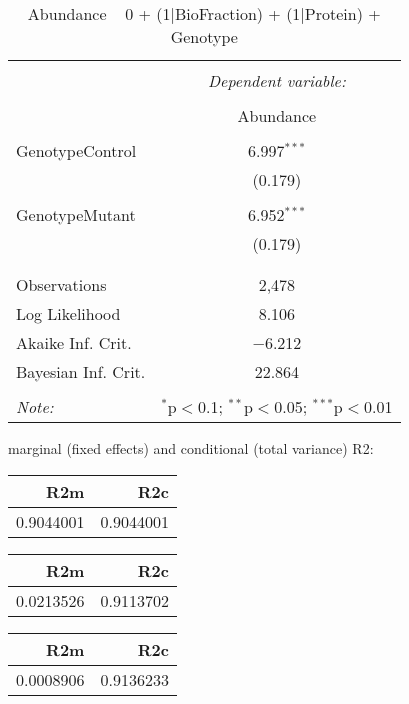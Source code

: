 \documentclass[11pt]{report}
\begin{document}
\begin{table}[!htbp] \centering 
  \caption{Abundance ~ 0 + (1|BioFraction) + (1|Protein) + Genotype} 
  \label{} 
\begin{tabular}{@{\extracolsep{5pt}}lc} 
\\[-1.8ex]\hline 
\hline \\[-1.8ex] 
 & \multicolumn{1}{c}{\textit{Dependent variable:}} \\ 
\cline{2-2} 
\\[-1.8ex] & Abundance \\ 
\hline \\[-1.8ex] 
 GenotypeControl & 6.997$^{***}$ \\ 
  & (0.179) \\ 
  & \\ 
 GenotypeMutant & 6.952$^{***}$ \\ 
  & (0.179) \\ 
  & \\ 
\hline \\[-1.8ex] 
Observations & 2,478 \\ 
Log Likelihood & 8.106 \\ 
Akaike Inf. Crit. & $-$6.212 \\ 
Bayesian Inf. Crit. & 22.864 \\ 
\hline 
\hline \\[-1.8ex] 
\textit{Note:}  & \multicolumn{1}{r}{$^{*}$p$<$0.1; $^{**}$p$<$0.05; $^{***}$p$<$0.01} \\ 
\end{tabular} 
\end{table} 
marginal (fixed effects) and conditional (total variance) R2:

\begin{tabular}{r|r}
\hline
R2m & R2c\\
\hline
0.9044001 & 0.9044001\\
\hline
\end{tabular}

\begin{tabular}{r|r}
\hline
R2m & R2c\\
\hline
0.0213526 & 0.9113702\\
\hline
\end{tabular}

\begin{tabular}{r|r}
\hline
R2m & R2c\\
\hline
0.0008906 & 0.9136233\\
\hline
\end{tabular}
\end{document}
